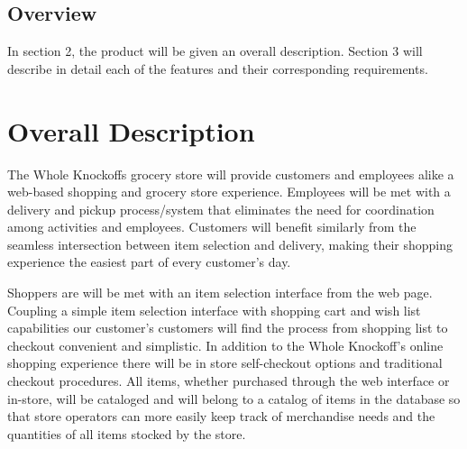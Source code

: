 \documentclass{scrreprt}
\theoremstyle{funreq}
\begin{document}
\section{Overview}
In section 2, the product will be given an overall description.  Section 3 will describe in detail each of the features and their corresponding requirements.   

{\let\clearpage\relax 
\chapter{Overall Description}}

The Whole Knockoffs grocery store will provide customers and employees alike a web-based shopping and grocery store experience. Employees will be met with a delivery and pickup process/system that eliminates the need for coordination among activities and employees. Customers will benefit similarly from the seamless intersection between item selection and delivery, making their shopping experience the easiest part of every customer's day. 

Shoppers are will be met with an item selection interface from the web page. Coupling a simple item selection interface with shopping cart and wish list capabilities our customer's customers will find the process from shopping list to checkout convenient and simplistic. In addition to the Whole Knockoff's online shopping experience there will be in store self-checkout options and traditional checkout procedures. All items, whether purchased through the web interface or in-store, will be cataloged and will belong to a catalog of items in the database so that store operators can more easily keep track of merchandise needs and the quantities of all items stocked by the store.
\end{document}

